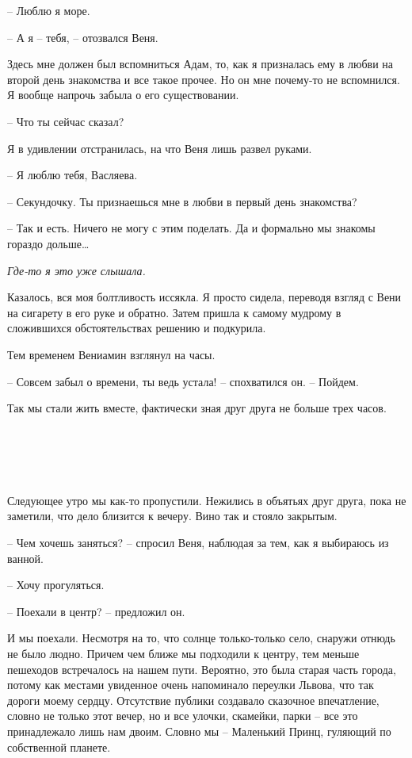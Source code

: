 \documentclass[
]{book}
\begin{document}
-- Люблю я море.

-- А я -- тебя, -- отозвался Веня.

Здесь мне должен был вспомниться Адам, то, как я призналась ему в любви на второй день знакомства и все такое прочее. Но он мне почему-то не вспомнился. Я вообще напрочь забыла о его существовании.

-- Что ты сейчас сказал?

Я в удивлении отстранилась, на что Веня лишь развел руками.

-- Я люблю тебя, Васляева.

-- Секундочку. Ты признаешься мне в любви в первый день знакомства?

-- Так и есть. Ничего не могу с этим поделать. Да и формально мы знакомы гораздо дольше\ldots{}

\emph{Где-то я это уже слышала.}

Казалось, вся моя болтливость иссякла. Я просто сидела, переводя взгляд с Вени на сигарету в его руке и обратно. Затем пришла к самому мудрому в сложившихся обстоятельствах решению и подкурила.

Тем временем Вениамин взглянул на часы.

-- Совсем забыл о времени, ты ведь устала! -- спохватился он. -- Пойдем.

Так мы стали жить вместе, фактически зная друг друга не больше трех часов.

\hypertarget{chapter-10}{%
\chapter{~}\label{chapter-10}}

Следующее утро мы как-то пропустили. Нежились в объятьях друг друга, пока не заметили, что дело близится к вечеру. Вино так и стояло закрытым.

-- Чем хочешь заняться? -- спросил Веня, наблюдая за тем, как я выбираюсь из ванной.

-- Хочу прогуляться.

-- Поехали в центр? -- предложил он.

И мы поехали. Несмотря на то, что солнце только-только село, снаружи отнюдь не было людно. Причем чем ближе мы подходили к центру, тем меньше пешеходов встречалось на нашем пути. Вероятно, это была старая часть города, потому как местами увиденное очень напоминало переулки Львова, что так дороги моему сердцу. Отсутствие публики создавало сказочное впечатление, словно не только этот вечер, но и все улочки, скамейки, парки -- все это принадлежало лишь нам двоим. Словно мы -- Маленький Принц, гуляющий по собственной планете.
\end{document}
